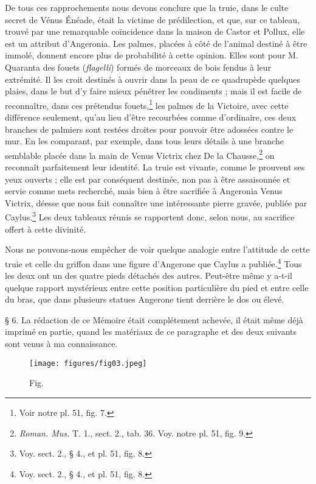 \documentclass[a4paper, 11pt, oneside, polutonikogreek, french]{article}
\begin{document}
De tous ces rapprochements nous devons conclure que la truie, dans le culte secret de Vénus Énéade, était la victime de prédilection, et que, sur ce tableau, trouvé par une remarquable coïncidence dans la maison de Castor et Pollux, elle est un attribut d'Angeronia. Les palmes, placées à côté de l'animal destiné à être immolé, donnent encore plus de probabilité à cette opinion. Elles sont pour M. Quaranta des fouets (\emph{flagelli}) formés de morceaux de bois fendus à leur extrémité. Il les croit destinés à ouvrir dans la peau de ce quadrupède quelques plaies, dans le but d'y faire mieux pénétrer les condiments ; mais il est facile de reconnaître, dans ces prétendus fouets,\footnote{Voir notre pl. 51, fig. 7.} les palmes de la Victoire, avec cette différence seulement, qu'au lieu d'être recourbées comme d'ordinaire, ces deux branches de palmiers sont restées droites pour pouvoir être adossées contre le mur. En les comparant, par exemple, dans tous leurs détails à une branche semblable placée dans la main de Venus Victrix chez De la Chausse,\footnote{\emph{Roman. Mus.} T. 1., sect. 2., tab. 36. Voy. notre pl. 51, fig. 9.} on reconnaît parfaitement leur identité. La truie est vivante, comme le prouvent ses yeux ouverts ; elle est par conséquent destinée, non pas à être assaisonnée et servie comme mets recherché, mais bien à être sacrifiée à Angeronia Venus Victrix, déesse que nous fait connaître une intéressante pierre gravée, publiée par Caylus.\footnote{Voy. sect. 2., § 4., et pl. 51, fig. 8.} Les deux tableaux réunis se rapportent donc, selon nous, au sacrifice offert à cette divinité.

Nous ne pouvons-nous empêcher de voir quelque analogie entre l'attitude de cette truie et celle du griffon dans une figure d'Angerone que Caylus a publiée.\footnote{Voy. sect. 2., § 4., et pl. 51, fig. 8.} Tous les deux ont un des quatre pieds détachés des autres. Peut-être même y a-t-il quelque rapport mystérieux entre cette position particulière du pied et entre celle du bras, que dans plusieurs statues Angerone tient derrière le dos ou élevé.

§ 6. La rédaction de ce Mémoire était complétement achevée, il était même déjà imprimé en partie, quand les matériaux de ce paragraphe et des deux suivants sont venus à ma connaissance.

\begin{figure}[H]
\centering
\texttt{[image: figures/fig03.jpeg]}
\caption{Fig.}
\end{figure}
\end{document}
